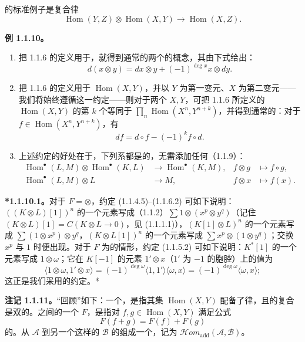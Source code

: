 的标准例子是复合律
\[
\operatorname{Hom}(Y,Z)\otimes\operatorname{Hom}(X,Y)\longrightarrow\operatorname{Hom}(X,Z).
\]

\textbf{例 1.1.10。}
\begin{enumerate}
\item[(i)] 把 1.1.6 的定义用于，就得到通常的两个的概念，其由下式给出：
\[
d(x\otimes y)=dx\otimes y+(-1)^{\deg x}x\otimes dy.
\]
\item[(ii)] 把 1.1.6 的定义用于 $\operatorname{Hom}(X,Y)$，并以 $Y$ 为第一变元、$X$ 为第二变元——我们将始终遵循这一约定——则对于两个 $X,Y$，可把 1.1.6 所定义的 $\operatorname{Hom}(X,Y)$ 的第 $k$ 个等同于 $\prod_n\operatorname{Hom}(X^n,Y^{n+k})$，并得到通常的：对于 $f\in\operatorname{Hom}(X^n,Y^{n+k})$，有
\[
df=d\circ f-(-1)^k f\circ d.
\]
\item[(iii)] 上述约定的好处在于，下列系都是的，无需添加任何（1.1.9）：
\[
\begin{aligned}
\operatorname{Hom}^{\bullet}(L,M)\otimes\operatorname{Hom}^{\bullet}(K,L)&\longrightarrow\operatorname{Hom}^{\bullet}(K,M),& f\otimes g&\longmapsto f\circ g,\\
\operatorname{Hom}^{\bullet}(L,M)\otimes L&\longrightarrow M,& f\otimes x&\longmapsto f(x).
\end{aligned}
\]
\end{enumerate}
\textbf{*1.1.10.1。}对于 $F=\otimes$，约定 (1.1.4.5)--(1.1.6.2) 可如下说明：$((K\otimes L)[1])^n$ 的一个元素写成（1.1.2）$\sum1\otimes(x^p\otimes y^q)$（记住 $(K\otimes L)[1]=C(K\otimes L\to0)$，见 (1.1.1.1)），$(K[1]\otimes L)^n$ 的一个元素写成 $\sum(1\otimes x^p)\otimes y^q$，$(K\otimes L[1])^n$ 的一个元素写成 $\sum x^p\otimes(1\otimes y^q)$；交换 $x^p$ 与 $1$ 时便出现。对于 $F$ 为的情形，约定 (1.1.5.2) 可如下说明：$K^*[1]$ 的一个元素写成 $1\otimes\omega$；它在 $K[-1]$ 的元素 $1'\otimes x$（$1'$ 为 $-1$ 的胞腔）上的值为
\[
\langle1\otimes\omega,1'\otimes x\rangle
=(-1)^{\deg\omega}\langle1,1'\rangle\langle\omega,x\rangle
=(-1)^{\deg\omega}\langle\omega,x\rangle;
\]
这正是我们采用的约定。*

\textbf{注记 1.1.11。}“回顾”如下：一个，是指其集 $\operatorname{Hom}(X,Y)$ 配备了律，且的复合是双的。之间的一个 $F$，是指对 $f,g\in\operatorname{Hom}(X,Y)$ 满足公式
\[
F(f+g)=F(f)+F(g)
\]
的。从 $\mathcal A$ 到另一个这样的 $\mathcal B$ 的组成一个，记为 $\mathcal H\!om_{\mathrm{add}}(\mathcal A,\mathcal B)$。

